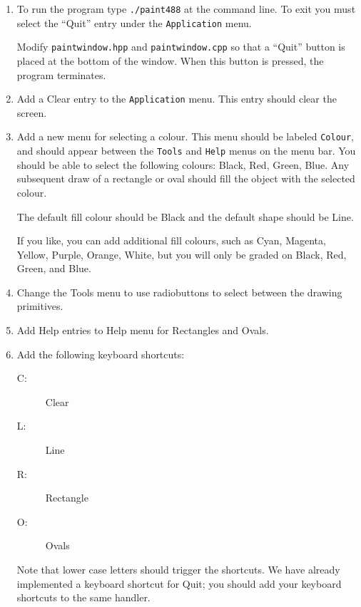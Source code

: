 \begin{enumerate}
        \item
                To run the program type \texttt{./paint488} at the
                command line.  To exit you must select
                the ``Quit'' entry under the \texttt{Application} menu.

                Modify \texttt{paintwindow.hpp} and
                \texttt{paintwindow.cpp} so that a ``Quit'' button is
                placed at the bottom of the window.  When this button
                is pressed, the program terminates.

        \item
                Add a Clear entry to the \texttt{Application} menu.  This entry should
                clear the screen.

        \item
                Add a new menu for selecting a colour.  This menu should
                be labeled \texttt{Colour}, and should appear between the
                \texttt{Tools} and \texttt{Help} menus on the menu bar.  You should
                be able to select the following colours: Black, Red,
                Green, Blue.
                Any subsequent draw of a rectangle or oval should fill
                the object with the selected colour.

                The default fill colour should be Black and the
                default shape should be Line.

                If you like, you can add additional fill colours, such
                as Cyan, Magenta, Yellow, Purple, Orange,
                White, but you will only be graded on Black, Red, Green,
                and Blue.
        \item
                Change the Tools menu to use radiobuttons to select
                between the drawing primitives.

        \item
                Add Help entries to Help menu for Rectangles and Ovals.

        \item
                Add the following keyboard shortcuts:
                \begin{description}
                        \item[C:] Clear
                        \item[L:] Line
                        \item[R:] Rectangle
                        \item[O:] Ovals
                \end{description}
		Note that lower case letters should
		trigger the shortcuts.  We have already implemented
		a keyboard shortcut for Quit; you should add your
		keyboard shortcuts to the same handler.


\end{enumerate}
